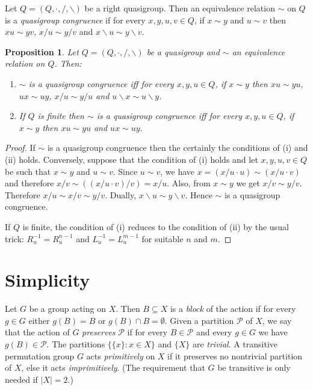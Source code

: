 \documentclass{amsart}
\def\rdiv{/}
\def\ldiv{\backslash}
\theoremstyle{plain}
\newtheorem{proposition}[theorem]{Proposition}
\theoremstyle{definition}
\begin{document}
Let $Q=(Q,\cdot,/,\ldiv)$ be a right quasigroup. Then an equivalence relation $\sim$ on $Q$ is a \emph{quasigroup congruence} if for every $x,y,u,v\in Q$, if $x\sim y$ and $u\sim v$ then $xu\sim yv$, $x/u\sim y/v$ and $x\ldiv u \sim y\ldiv v$.

\begin{proposition}
Let $Q=(Q,\cdot,/,\ldiv)$ be a quasigroup and $\sim$ an equivalence relation on $Q$. Then:
\begin{enumerate}
\item[(i)] $\sim$ is a quasigroup congruence iff for every $x,y,u\in Q$, if $x\sim y$ then $xu\sim yu$, $ux\sim uy$, $x\rdiv u \sim y\rdiv u$ and $u\ldiv x\sim u\ldiv y$.
\item[(ii)] If $Q$ is finite then $\sim$ is a quasigroup congruence iff for every $x,y,u\in Q$, if $x\sim y$ then $xu\sim yu$ and $ux\sim uy$.
\end{enumerate}
\end{proposition}
\begin{proof}
If $\sim$ is a quasigroup congruence then the certainly the conditions of (i) and (ii) holds. Conversely, suppose that the condition of (i) holds and let $x,y,u,v\in Q$ be such that $x\sim y$ and $u\sim v$. Since $u\sim v$, we have $x = (x/u\cdot u)\sim (x/u\cdot v)$ and therefore $x/v \sim ((x/u\cdot v)/v) = x/u$. Also, from $x\sim y$ we get $x/v\sim y/v$. Therefore $x/u\sim x/v\sim y/v$. Dually, $x\ldiv u\sim y\ldiv v$. Hence $\sim$ is a quasigroup congruence.

If $Q$ is finite, the condition of (i) reduces to the condition of (ii) by the usual trick: $R_u^{-1}=R_u^{n-1}$ and $L_u^{-1}=L_u^{m-1}$ for suitable $n$ and $m$.
\end{proof}


\section{Simplicity}

Let $G$ be a group acting on $X$. Then $B\subseteq X$ is a \emph{block} of the action if for every $g\in G$ either $g(B)=B$ or $g(B)\cap B=\emptyset$. Given a partition $\mathcal P$ of $X$, we say that the action of $G$ \emph{preserves} $\mathcal P$ if for every $B\in\mathcal P$ and every $g\in G$ we have $g(B)\in\mathcal P$. The partitions $\{\{x\}:x\in X\}$ and $\{X\}$ are \emph{trivial}. A transitive permutation group $G$ acts \emph{primitively} on $X$ if it preserves no nontrivial partition of $X$, else it acts \emph{imprimitively}. (The requirement that $G$ be transitive is only needed if $|X|=2$.)
\end{document}
